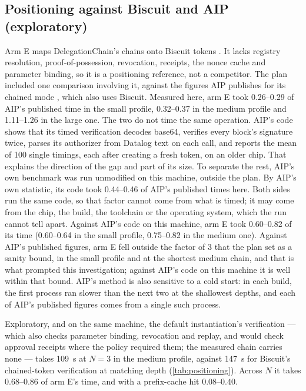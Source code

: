 \documentclass[11pt,a4paper]{article}
\begin{document}
\subsection{Positioning against Biscuit and AIP (exploratory)}
\label{sec:eval-positioning}

Arm E maps DelegationChain's chains onto Biscuit tokens
\citep{biscuit-spec,biscuit-auth-6.0.0}. It lacks registry resolution,
proof-of-possession, revocation, receipts, the nonce cache and parameter
binding, so it is a positioning reference, not a competitor. The plan
included one comparison involving it, against the figures AIP publishes
for its chained mode \citep{prakash2026aip}, which also uses Biscuit.
Measured here, arm E took 0.26--0.29 of AIP's published time in the
small profile, 0.32--0.37 in the medium profile and 1.11--1.26 in the
large one. The two do not time the same operation. AIP's code
\citep{aip-code-ad2faa6} shows that its timed verification decodes
base64, verifies every block's signature twice, parses its authorizer
from Datalog text on each call, and reports the mean of 100 single
timings, each after creating a fresh token, on an older chip. That
explains the direction of the gap and part of its size. To separate the
rest, AIP's own benchmark was run unmodified on this machine, outside
the plan. By AIP's own statistic, its code took 0.44--0.46 of AIP's
published times here. Both sides run the same code, so that factor
cannot come from what is timed; it may come from the chip, the build,
the toolchain or the operating system, which the run cannot tell apart.
Against AIP's code on this machine, arm E took 0.60--0.82 of its time
(0.60--0.64 in the small profile, 0.75--0.82 in the medium one).
Against AIP's published figures, arm E fell outside the factor of 3 that
the plan set as a sanity bound, in the small profile and at the shortest
medium chain, and that is what prompted this investigation; against
AIP's code on this machine it is well within that bound. AIP's method is also sensitive to a cold start: in each
build, the first process ran slower than the next two at the shallowest
depths, and each of AIP's published figures comes from a single such
process.

Exploratory, and on the same machine, the default instantiation's
verification --- which also checks parameter binding, revocation and
replay, and would check approval receipts where the policy required
them; the measured chain carries none --- takes 109~\textmu{}s at $N = 3$ in the medium
profile, against 147~\textmu{}s for Biscuit's chained-token verification
at matching depth (\cref{tab:positioning}). Across $N$ it takes
0.68--0.86 of arm E's time, and with a prefix-cache hit 0.08--0.40.
\end{document}

